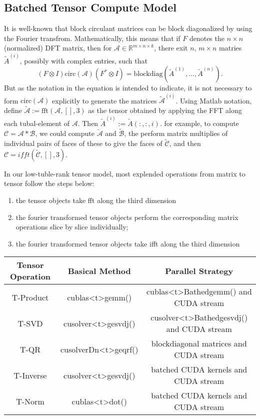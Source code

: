 \documentclass[format=acmsmall, review=false, screen=true]{acmart}
\begin{document}
\subsection{Batched Tensor Compute Model}
It is well-known that block circulant matrices can be block diagonalized by using the Fourier transfrom. Mathematically, this means that if $F$ denotes the $n \times n$ (normalized) DFT matrix, then for $\mathcal{A} \in \mathbb{R}^{m \times n \times k}$, there exit $n$, $m \times n$ matries $\widetilde{A}^{(i)}$, possibly with complex entries, such that
$$
(F \otimes I)\mathrm{circ}(\mathcal{A})(F^{\ast} \otimes I) = \mathrm{blockdiag}(\widetilde{A}^{(1)},..., \widetilde{A}^{(n)}).
$$
But as the notation in the equation is intended to indicate, it is not necessary to form $\mathrm{circ}(\mathcal{A})$ explicitly to generate the matrices $\widetilde{\mathcal{A}}^{(i)}$. Using Matlab notation, define $\widetilde{\mathcal{A}} := \mathrm{fft}(\mathcal{A},[],3)$ as the tensor obtained by applying the FFT along each tubal-element of $\mathcal{A}$. Then $\widetilde{A}^{(i)} := \widetilde{A}(:,:,i)$. 
for example, to compute $\mathcal{C} = \mathcal{A} \ast \mathcal{B}$, we could compute $\widetilde{\mathcal{A}}$ and $\widetilde{\mathcal{B}}$, the perform matrix multiplies of individual pairs of faces of these to give the faces of $\widetilde{\mathcal{C}}$, and then $\mathcal{C} = ifft(\widetilde{\mathcal{C}}, [], 3)$.

In our low-tuble-rank tensor model, most explended operations from matrix to tensor follow the steps below:
\begin{enumerate}
    \item the tensor objects take fft along the third dimension
    \item the fourier transformed tensor objects perform the corresponding matrix operations slice by slice individually; 
    \item the fourier transformed tensor objects take ifft along the third dimension
\end{enumerate}

\begin{tabular}{|c|c|c|}
    \hline
     Tensor Operation & Basical Method & Parallel Strategy  \\
     \hline
     T-Product & cublas<t>gemm() & cublas<t>Bathedgemm() and CUDA stream \\
     \hline
     T-SVD & cusolver<t>gesvdj() & cusolver<t>Bathedgesvdj() and CUDA stream \\
     \hline
     T-QR & \textup{cusolverDn<t>geqrf()} & blockdiagonal matrices and CUDA stream \\
     \hline
     T-Inverse & cusolver<t>gesvdj() & batched CUDA kernels and CUDA stream \\
     \hline
     T-Norm & cublas<t>dot() & batched CUDA kernels and CUDA stream \\
     \hline
\end{tabular}
\end{document}
